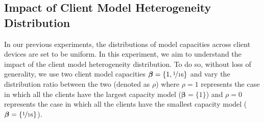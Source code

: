 \documentclass{article}
\begin{document}
%

%
\subsection{Impact of Client Model Heterogeneity Distribution}
\label{sec:distributions}

In our previous experiments, the distributions of model capacities across client devices are set to be uniform. 
%
In this experiment, we aim to understand the impact of the client model heterogeneity distribution.
%
To do so, without loss of generality, we use two client model capacities $\boldsymbol\beta=\{1, \nicefrac{1}{16}\}$ and vary the distribution ratio between the two (denoted as $\rho$) where $\rho = 1$ represents the case in which all the clients have the largest capacity model ($\boldsymbol{\beta}=\{1\}$) and $\rho = 0$ represents the case in which all the clients have the smallest capacity model ($\boldsymbol{\beta}=\{\nicefrac{1}{16}\}$).
\end{document}

